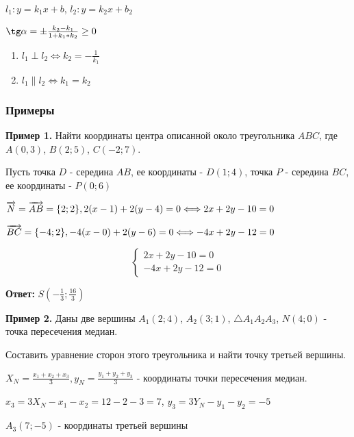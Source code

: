 \documentclass{article}
\def\vec{\ensuremath\overrightarrow}
\begin{document}
\begin{flushleft}
$l_1: y = k_1 x + b$, $l_2: y = k_2 x + b_2$

$\tg \alpha = \pm \frac{k_2 - k_1}{1 + k_1 * k_2} \ge 0$

\begin{enumerate}
    \item $l_1 \perp l_2 \Longleftrightarrow k_2 = -\frac{1}{k_1}$
    \item $l_1 \parallel l_2 \Longleftrightarrow k_1 = k_2$
\end{enumerate}

\subsubsection{Примеры}

\textbf{Пример 1.} Найти координаты центра описанной около треугольника $ABC$, где $A(0, 3)$, $B(2; 5)$, $C(-2; 7)$.

Пусть точка $D$ - середина $AB$, ее координаты - $D(1; 4)$, точка $P$ - середина $BC$, ее координаты - $P(0; 6)$

\hfill

$\vec{N} = \vec{AB} = \{ 2; 2 \}, 2(x - 1) + 2(y - 4) = 0 \Longleftrightarrow 2x + 2y - 10 = 0$

$\vec{BC} = \{ -4; 2 \}, -4(x - 0) + 2 (y - 6) = 0 \Longleftrightarrow -4x + 2y - 12 = 0$

\hfill

\begin{equation}
    \begin{cases}
        2x + 2y - 10 = 0 \\
        -4x + 2y - 12 = 0
    \end{cases}
\end{equation}

\textbf{Ответ:} $S(-\frac{1}{3}; \frac{16}{3})$

\hfill

\textbf{Пример 2.} Даны две вершины $A_1(2; 4)$, $A_2(3; 1)$, $\triangle A_1 A_2 A_3$, $N(4; 0)$ - точка пересечения медиан.

Составить уравнение сторон этого треугольника и найти точку третьей вершины.

\hfill

$X_N = \frac{x_1 + x_2 + x_3}{3}, y_N = \frac{y_1 + y_2 + y_3}{3}$ - координаты точки пересечения медиан.

$x_3 = 3X_N - x_1 - x_2 = 12 - 2 - 3 = 7$, $y_3 = 3Y_N - y_1 - y_2 = -5$

$A_3(7; -5)$ - координаты третьей вершины


\end{flushleft}
\end{document}

